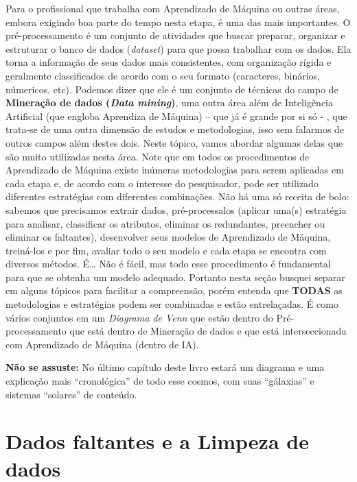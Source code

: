 \documentclass[
]{book}
\begin{document}
Para o profissional que trabalha com Aprendizado de Máquina ou outras áreas, embora exigindo boa parte do tempo nesta etapa, é uma das mais importantes. O pré-processamento é um conjunto de atividades que buscar preparar, organizar e estruturar o banco de dados (\emph{dataset}) para que possa trabalhar com os dados. Ela torna a informação de seus dados mais consistentes, com organização rígida e geralmente classificados de acordo com o seu formato (caracteres, binários, númericos, etc). Podemos dizer que ele é um conjunto de técnicas do campo de \textbf{Mineração de dados (\emph{Data mining})}, uma outra área além de Inteligência Artificial (que engloba Aprendiza de Máquina) -- que já é grande por si só - , que trata-se de uma outra dimensão de estudos e metodologias, isso sem falarmos de outros campos além destes dois. Neste tópico, vamos abordar algumas delas que são muito utilizadas nesta área. Note que em todos os procedimentos de Aprendizado de Máquina existe inúmeras metodologias para serem aplicadas em cada etapa e, de acordo com o interesse do pesquisador, pode ser utilizado diferentes estratégias com diferentes combinações. Não há uma só receita de bolo: sabemos que precisamos extrair dados, pré-processalos (aplicar uma(s) estratégia para analisar, classificar os atributos, eliminar os redundantes, preencher ou eliminar os faltantes), desenvolver seus modelos de Aprendizado de Máquina, treiná-los e por fim, avaliar todo o seu modelo e cada etapa se encontra com diversos métodos. É\ldots{} Não é fácil, mas todo esse procedimento é fundamental para que se obtenha um modelo adequado. Portanto nesta seção busquei separar em alguns tópicos para facilitar a compreensão, porém entenda que \textbf{TODAS} as metodologias e estratégias podem ser combinadas e estão entrelaçadas. É como vários conjuntos em um \emph{Diagrama de Venn} que estão dentro do Pré-processamento que está dentro de Mineração de dados e que está interseccionada com Aprendizado de Máquina (dentro de IA).

\textbf{Não se assuste:} No último capítulo deste livro estará um diagrama e uma explicação mais ``cronológica'' de todo esse cosmos, com suas ``gálaxias'' e sistemas ``solares'' de conteúdo.

\hypertarget{dados-faltantes-e-a-limpeza-de-dados}{%
\section{Dados faltantes e a Limpeza de dados}\label{dados-faltantes-e-a-limpeza-de-dados}}
\end{document}
